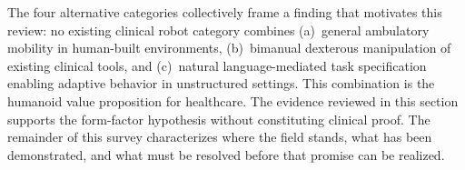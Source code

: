 The four alternative categories collectively frame a finding that motivates this
review: no existing clinical robot category combines (a)~general ambulatory
mobility in human-built environments, (b)~bimanual dexterous manipulation of
existing clinical tools, and (c)~natural language-mediated task specification
enabling adaptive behavior in unstructured settings. This combination is the
humanoid value proposition for healthcare. The evidence reviewed in this section
supports the form-factor hypothesis without constituting clinical proof. The
remainder of this survey characterizes where the field stands, what has been
demonstrated, and what must be resolved before that promise can be realized.

